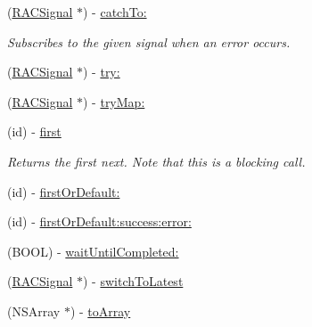 \begin{DoxyCompactItemize}
\mbox{\label{category_r_a_c_signal_07_operations_08_a0b1efe6d0548703cb25b8e436532e574}} 
(\mbox{\hyperlink{interface_r_a_c_signal}{R\+A\+C\+Signal}} $\ast$) -\/ \mbox{\hyperlink{category_r_a_c_signal_07_operations_08_a0b1efe6d0548703cb25b8e436532e574}{catch\+To\+:}}
\begin{DoxyCompactList}\small\item\em Subscribes to the given signal when an error occurs. \end{DoxyCompactList}\item 
(\mbox{\hyperlink{interface_r_a_c_signal}{R\+A\+C\+Signal}} $\ast$) -\/ \mbox{\hyperlink{category_r_a_c_signal_07_operations_08_ac65d7a1a19db9cb2f78c03781995bbe9}{try\+:}}
\item 
(\mbox{\hyperlink{interface_r_a_c_signal}{R\+A\+C\+Signal}} $\ast$) -\/ \mbox{\hyperlink{category_r_a_c_signal_07_operations_08_a282c8989886b5b9a75e4ecb298221b58}{try\+Map\+:}}
\item 
\mbox{\label{category_r_a_c_signal_07_operations_08_a06f71dd31099b1ed555f0b9fcbbdf6f1}} 
(id) -\/ \mbox{\hyperlink{category_r_a_c_signal_07_operations_08_a06f71dd31099b1ed555f0b9fcbbdf6f1}{first}}
\begin{DoxyCompactList}\small\item\em Returns the first {\ttfamily next}. Note that this is a blocking call. \end{DoxyCompactList}\item 
(id) -\/ \mbox{\hyperlink{category_r_a_c_signal_07_operations_08_a51f980781f2dc9e662278d7db7b0cd38}{first\+Or\+Default\+:}}
\item 
(id) -\/ \mbox{\hyperlink{category_r_a_c_signal_07_operations_08_a12b765a16842e9c7aa1d13b00d8df09b}{first\+Or\+Default\+:success\+:error\+:}}
\item 
(B\+O\+OL) -\/ \mbox{\hyperlink{category_r_a_c_signal_07_operations_08_af4c476fc335ca830841bd4fd267f05ce}{wait\+Until\+Completed\+:}}
\item 
(\mbox{\hyperlink{interface_r_a_c_signal}{R\+A\+C\+Signal}} $\ast$) -\/ \mbox{\hyperlink{category_r_a_c_signal_07_operations_08_a0a6780c4580e1a5338a9a891f7c69ea1}{switch\+To\+Latest}}
\item 
(N\+S\+Array $\ast$) -\/ \mbox{\hyperlink{category_r_a_c_signal_07_operations_08_a5b7a649ea4635f423b73cd4924652fe5}{to\+Array}}
\item 

\end{DoxyCompactItemize}
